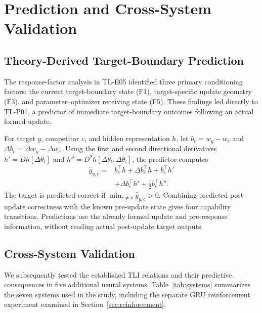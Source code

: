 \documentclass[10pt,twocolumn,letterpaper]{article}
\begin{document}
\clearpage
\section{Prediction and Cross-System Validation}
\subsection{Theory-Derived Target-Boundary Prediction}
The response-factor analysis in TL-E05 identified three primary conditioning factors: the current target-boundary state (F1), target-specific update geometry (F3), and parameter--optimizer receiving state (F5). These findings led directly to TL-P01, a predictor of immediate target-boundary outcomes following an actual formed update.

For target $y$, competitor $c$, and hidden representation $h$, let $b_c=w_y-w_c$ and $\Delta b_c=\Delta w_y-\Delta w_c$. Using the first and second directional derivatives $h'=Dh[\Delta\theta_t]$ and $h''=D^2h[\Delta\theta_t,\Delta\theta_t]$, the predictor computes
\begin{equation}
 \begin{aligned}
 \widehat g_{y,c}={}&b_c^\top h+\Delta b_c^\top h+b_c^\top h'\\
 &+\Delta b_c^\top h'+\tfrac12 b_c^\top h''.
 \end{aligned}
 \label{eq:predict}
\end{equation}
The target is predicted correct if $\min_{c\ne y}\widehat g_{y,c}>0$. Combining predicted post-update correctness with the known pre-update state gives four capability transitions. Predictions use the already formed update and pre-response information, without reading actual post-update target outputs.

\subsection{Cross-System Validation}
We subsequently tested the established TLI relations and their predictive consequences in five additional neural systems. Table~\ref{tab:systems} summarizes the seven systems used in the study, including the separate GRU reinforcement experiment examined in Section~\ref{sec:reinforcement}.
\end{document}
